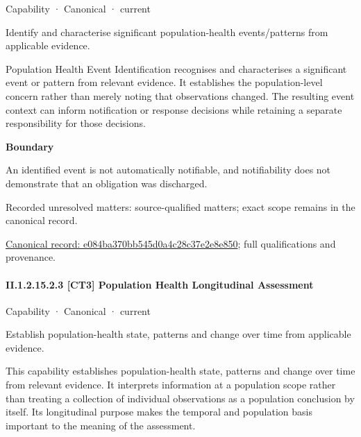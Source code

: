 \label{element:e084ba370bb545d0a4c28c37e2e8e850}
{\small Capability · Canonical · current}\par

Identify and characterise significant population-health events/patterns from applicable evidence.



Population Health Event Identification recognises and characterises a significant event or pattern from relevant evidence. It establishes the population-level concern rather than merely noting that observations changed. The resulting event context can inform notification or response decisions while retaining a separate responsibility for those decisions.



\textbf{Boundary}



An identified event is not automatically notifiable, and notifiability does not demonstrate that an obligation was discharged.


{\small Recorded unresolved matters: source-qualified matters; exact scope remains in the canonical record.}\par
{\footnotesize \href{../../../../continuum/strategy/capability/e084ba370bb545d0a4c28c37e2e8e850.md}{Canonical record: e084ba370bb545d0a4c28c37e2e8e850}; full qualifications and provenance.}\par
\paragraph*{II.1.2.15.2.3 [CT3] Population Health Longitudinal Assessment}
\label{navigation:II.1.2.15.2.3}

\label{element:4d52b8acda504329a595be27a736e63c}
{\small Capability · Canonical · current}\par

Establish population-health state, patterns and change over time from applicable evidence.



This capability establishes population-health state, patterns and change over time from relevant evidence. It interprets information at a population scope rather than treating a collection of individual observations as a population conclusion by itself. Its longitudinal purpose makes the temporal and population basis important to the meaning of the assessment.



